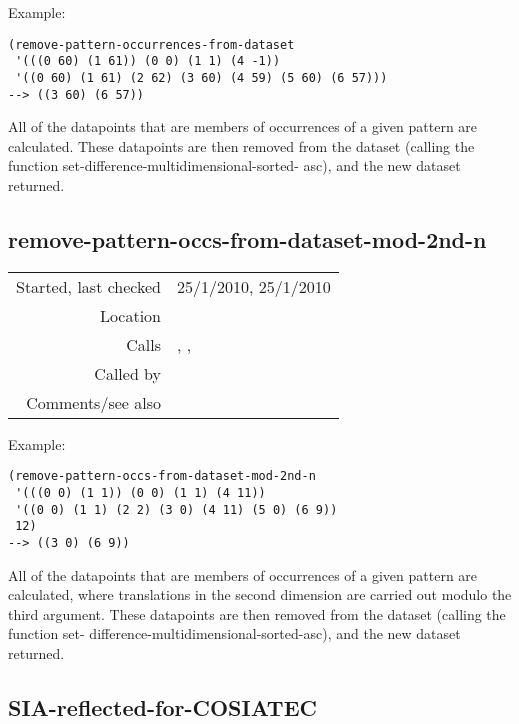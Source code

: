 \vspace{0.5cm}
\noindent Example:
\begin{verbatim}
(remove-pattern-occurrences-from-dataset
 '(((0 60) (1 61)) (0 0) (1 1) (4 -1))
 '((0 60) (1 61) (2 62) (3 60) (4 59) (5 60) (6 57)))
--> ((3 60) (6 57))
\end{verbatim}

\noindent All of the datapoints that are members of
occurrences of a given pattern are calculated. These
datapoints are then removed from the dataset (calling
the function set-difference-multidimensional-sorted-
asc), and the new dataset returned.


\subsection*{remove-pattern-occs-from-dataset-mod-2nd-n}\label{fun:remove-pattern-occs-from-dataset-mod-2nd-n}

\vspace{0.3cm}
\begin{tabular}{r|p{8cm}}
Started, last checked & 25/1/2010, 25/1/2010 \\
Location & \nameref{sec:further-structural-induction-algorithms} \\
Calls & \nameref{fun:set-difference-multidimensional-sorted-asc}, \nameref{fun:translations-mod-2nd-n},\newline \nameref{fun:unions-multidimensional-sorted-asc} \\
Called by & \nameref{fun:COSIATEC-mod-2nd-n} \\
Comments/see also & \nameref{fun:remove-pattern-occurrences-from-dataset}
\end{tabular}

\vspace{0.5cm}
\noindent Example:
\begin{verbatim}
(remove-pattern-occs-from-dataset-mod-2nd-n
 '(((0 0) (1 1)) (0 0) (1 1) (4 11))
 '((0 0) (1 1) (2 2) (3 0) (4 11) (5 0) (6 9))
 12)
--> ((3 0) (6 9))
\end{verbatim}

\noindent All of the datapoints that are members of
occurrences of a given pattern are calculated, where
translations in the second dimension are carried out
modulo the third argument. These datapoints are then
removed from the dataset (calling the function set-
difference-multidimensional-sorted-asc), and the new
dataset returned.


\subsection*{SIA-reflected-for-COSIATEC}\label{fun:SIA-reflected-for-COSIATEC}

